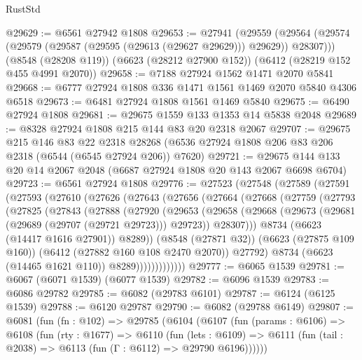 \begin{lexlean}{RustStd}
\begin{coremodule}
@29629 := @6561 @27942 @1808
@29653 := @27941
    (@29559 (@29564 (@29574 (@29579 (@29587 (@29595 (@29613 (@29627 @29629))) @29629)) @28307)))
    (@8548 (@28208 @119))
    (@6623 (@28212 @27900 @152))
    (@6412 (@28219 @152 @455 @4991 @2070))
@29658 := @7188 @27924 @1562 @1471 @2070 @5841
@29668 := @6777 @27924 @1808 @336 @1471 @1561 @1469 @2070 @5840 @4306 @6518
@29673 := @6481 @27924 @1808 @1561 @1469 @5840
@29675 := @6490 @27924 @1808
@29681 := @29675 @1559 @133 @1353 @14 @5838 @2048
@29689 := @8328 @27924 @1808 @215 @144 @83 @20 @2318 @2067
@29707 := @29675
    @215
    @146
    @83
    @22
    @2318
    @28268
    (@6536 @27924 @1808 @206 @83 @206 @2318 (@6544 (@6545 @27924 @206)) @7620)
@29721 := @29675 @144 @133 @20 @14 @2067 @2048 (@6687 @27924 @1808 @20 @143 @2067 @6698 @6704)
@29723 := @6561 @27924 @1808
@29776 := @27523
    (@27548
      (@27589
        (@27591
          (@27593
            (@27610
              (@27626
                (@27643
                  (@27656
                    (@27664
                      (@27668
                        (@27759
                          (@27793
                            (@27825
                              (@27843
                                (@27888
                                  (@27920
                                    (@29653
                                      (@29658
                                        (@29668
                                          (@29673 (@29681 (@29689 (@29707 (@29721 @29723))) @29723))
                                          @28307)))
                                    @8734
                                    (@6623 (@14417 @1616 @27901))
                                    @8289))
                                (@8548 (@27871 @32))
                                (@6623 (@27875 @109 @160))
                                (@6412 (@27882 @160 @108 @2470 @2070))
                                @27792)
                              @8734
                              (@6623 (@14465 @1621 @110))
                              @8289)))))))))))))
@29777 := @6065 @1539
@29781 := @6067 (@6071 @1539) (@6077 @1539)
@29782 := @6096 @1539
@29783 := @6086 @29782
@29785 := @6082 (@29783 @6101)
@29787 := @6124 (@6125 @1539)
@29788 := @6120 @29787
@29790 := @6082 (@29788 @6149)
@29807 := @6081
    (fun (fn : @102) =>
    @29785
      (@6104
        (@6107
          (fun (params : @6106) =>
          @6108
            (fun (rty : @1677) =>
            @6110
              (fun (lets : @6109) =>
              @6111 (fun (tail : @2038) => @6113 (fun (Γ : @6112) => @29790 @6196))))))

\end{coremodule}
\end{lexlean}
